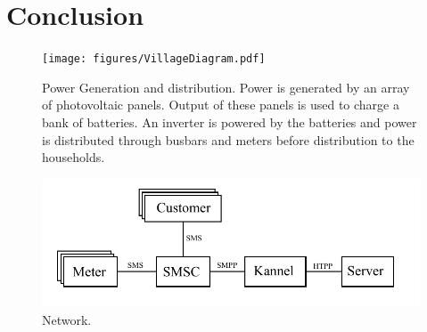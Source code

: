 \documentclass[conference]{IEEEtran}
\begin{document}
\section{Conclusion}


\begin{figure}[]
\begin{center}
\texttt{[image: figures/VillageDiagram.pdf]}
\end{center}
\caption{Power Generation and distribution.
Power is generated by an array of photovoltaic panels.
Output of these panels is used to charge a bank of batteries.
An inverter is powered by the batteries and power is distributed
through busbars and meters before distribution to the households.}
\label{ShedWiringDiagram}
\end{figure}


\begin{figure}[]
\begin{center}
\includegraphics[width=\columnwidth]{figures/NetworkDiagram.pdf}
\end{center}
\caption{Network.}
\label{SoftwareDiagram}
\end{figure}
\end{document}
